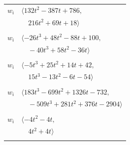 \documentclass[11pt]{article}
\begin{document}
\begin{longtable}{@{}ll@{}}
$w_i$ & $\langle 132t^{2}-387t+786,$\\
 & $\quad 216t^{2}+69t+18\rangle$\\
\addlinespace[2pt]
\multicolumn{2}{@{}p{0.97\textwidth}@{}}{$i=5$, $D_i=1$, $\rho_{ij}$: $0{:}1, \allowbreak 4{:}2, \allowbreak 12{:}2, \allowbreak 15{:}1, \allowbreak 18{:}1, \allowbreak 19{:}2, \allowbreak 23{:}1, \allowbreak 26{:}1, \allowbreak 27{:}1, \allowbreak 28{:}2, \allowbreak 29{:}2, \allowbreak 35{:}3, \allowbreak 36{:}2, \allowbreak 37{:}1, \allowbreak 44{:}1, \allowbreak 47{:}2, \allowbreak 57{:}3$}\\
$w_i$ & $\langle -26t^{3}+48t^{2}-88t+100,$\\
 & $\quad -40t^{3}+58t^{2}-36t\rangle$\\
\addlinespace[2pt]
\multicolumn{2}{@{}p{0.97\textwidth}@{}}{$i=6$, $D_i=1$, $\rho_{ij}$: $0{:}3, \allowbreak 9{:}1, \allowbreak 11{:}1, \allowbreak 14{:}1, \allowbreak 15{:}1, \allowbreak 17{:}1, \allowbreak 18{:}3, \allowbreak 21{:}1, \allowbreak 29{:}2, \allowbreak 30{:}3, \allowbreak 37{:}3, \allowbreak 44{:}2, \allowbreak 46{:}3, \allowbreak 47{:}3, \allowbreak 48{:}1$}\\
$w_i$ & $\langle -5t^{3}+25t^{2}+14t+42,$\\
 & $\quad 15t^{3}-13t^{2}-6t-54\rangle$\\
\addlinespace[2pt]
\multicolumn{2}{@{}p{0.97\textwidth}@{}}{$i=7$, $D_i=1$, $\rho_{ij}$: $0{:}1, \allowbreak 3{:}2, \allowbreak 10{:}3, \allowbreak 12{:}3, \allowbreak 26{:}3, \allowbreak 27{:}1, \allowbreak 32{:}3, \allowbreak 38{:}3, \allowbreak 41{:}2, \allowbreak 43{:}2, \allowbreak 45{:}2, \allowbreak 48{:}3, \allowbreak 50{:}1, \allowbreak 54{:}1$}\\
$w_i$ & $\langle 183t^{3}-699t^{2}+1326t-732,$\\
 & $\quad -509t^{3}+281t^{2}+376t-2904\rangle$\\
\addlinespace[2pt]
\multicolumn{2}{@{}p{0.97\textwidth}@{}}{$i=8$, $D_i=1$, $e_i=3$, $\rho_{ij}$: $3{:}2, \allowbreak 9{:}1, \allowbreak 23{:}2, \allowbreak 28{:}1, \allowbreak 46{:}1, \allowbreak 47{:}1$}\\
$w_i$ & $\langle -4t^{2}-4t,$\\
 & $\quad 4t^{2}+4t\rangle$\\
\addlinespace[2pt]
\multicolumn{2}{@{}p{0.97\textwidth}@{}}{$i=9$, $D_i=1$, $\rho_{ij}$: $1{:}1, \allowbreak 2{:}1, \allowbreak 6{:}3, \allowbreak 8{:}3, \allowbreak 23{:}1, \allowbreak 26{:}3, \allowbreak 31{:}2, \allowbreak 36{:}1, \allowbreak 44{:}2, \allowbreak 46{:}2, \allowbreak 47{:}2, \allowbreak 49{:}1, \allowbreak 51{:}2, \allowbreak 52{:}2$}\\

\end{longtable}
\end{document}
